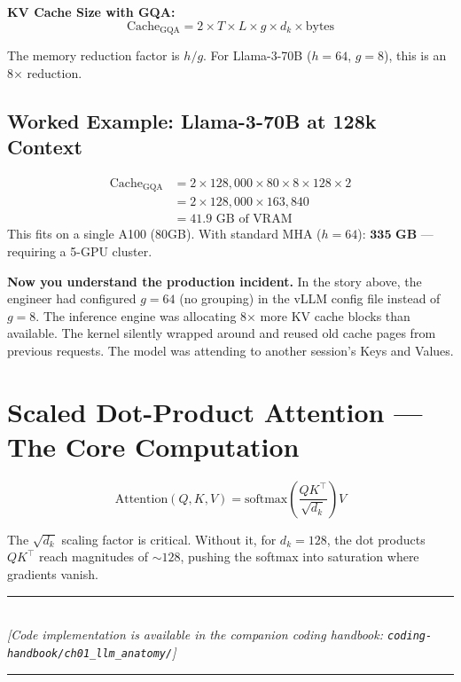 \textbf{KV Cache Size with GQA:}
\begin{equation}
\text{Cache}_{\text{GQA}} = 2 \times T \times L \times g \times d_k \times \text{bytes}
\end{equation}

The memory reduction factor is $h/g$. For Llama-3-70B ($h=64$, $g=8$), this is an 8× reduction.

\subsection{Worked Example: Llama-3-70B at 128k Context}
\begin{align}
\text{Cache}_{\text{GQA}} &= 2 \times 128{,}000 \times 80 \times 8 \times 128 \times 2 \\
&= 2 \times 128{,}000 \times 163{,}840 \\
&= 41.9 \text{ GB of VRAM}
\end{align}
This fits on a single A100 (80GB). With standard MHA ($h=64$): $\mathbf{335 \text{ GB}}$ — requiring a 5-GPU cluster.

\textbf{Now you understand the production incident.} In the story above, the engineer had configured $g=64$ (no grouping) in the vLLM config file instead of $g=8$. The inference engine was allocating 8× more KV cache blocks than available. The kernel silently wrapped around and reused old cache pages from previous requests. The model was attending to another session's Keys and Values.

\section{Scaled Dot-Product Attention — The Core Computation}

\begin{equation}
\text{Attention}(Q, K, V) = \text{softmax}\!\left(\frac{QK^\top}{\sqrt{d_k}}\right) V
\end{equation}

The $\sqrt{d_k}$ scaling factor is critical. Without it, for $d_k=128$, the dot products $QK^\top$ reach magnitudes of $\sim 128$, pushing the softmax into saturation where gradients vanish.


\begin{center}
\noindent\rule{0.6\textwidth}{0.4pt} \\
\vspace{0.3em}
\textit{[Code implementation is available in the companion coding handbook: \texttt{coding-handbook/ch01\_llm\_anatomy/}]} \\
\noindent\rule{0.6\textwidth}{0.4pt}
\end{center}


